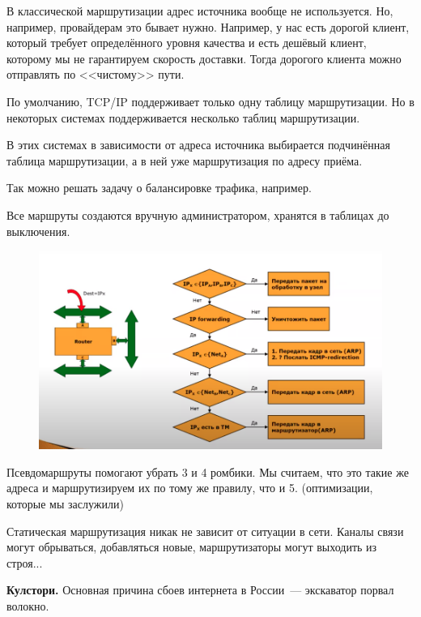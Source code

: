 В классической маршрутизации адрес источника вообще не используется. Но, например, провайдерам это бывает нужно. Например, у нас есть дорогой клиент, который требует определённого уровня качества и есть дешёвый клиент, которому мы не гарантируем скорость доставки. Тогда дорогого клиента можно отправлять по <<чистому>> пути.

По умолчанию, TCP/IP поддерживает только одну таблицу маршрутизации. Но в некоторых системах поддерживается несколько таблиц маршрутизации.

В этих системах в зависимости от адреса источника выбирается подчинённая таблица маршрутизации, а в ней уже маршрутизация по адресу приёма.

Так можно решать задачу о балансировке трафика, например.


Все маршруты создаются вручную администратором, хранятся в таблицах до выключения.

\begin{figure}[H]
  \centering
  \includegraphics[width=15cm]{images/04/03}
\end{figure}

Псевдомаршруты помогают убрать 3 и 4 ромбики. Мы считаем, что это такие же адреса и маршрутизируем их по тому же правилу, что и 5. (оптимизации, которые мы заслужили)


Статическая маршрутизация никак не зависит от ситуации в сети. Каналы связи могут обрываться, добавляться новые, маршрутизаторы могут выходить из строя...

{\bf Кулстори.} Основная причина сбоев интернета в России~--- экскаватор порвал волокно.

